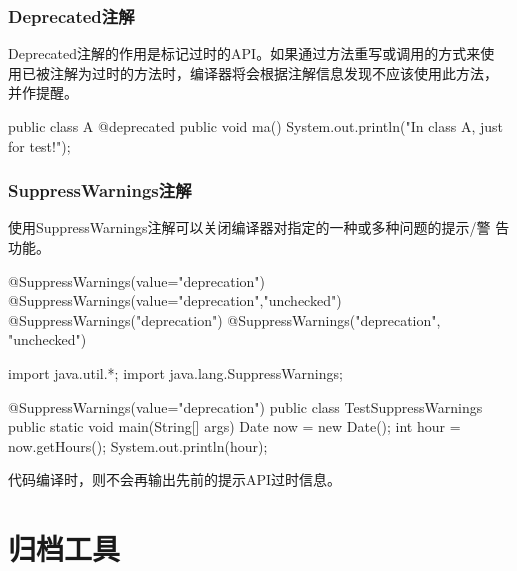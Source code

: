 \begin{frame}[fragile] %
  \frametitle{Deprecated注解}

  Deprecated注解的作用是标记过时的API。如果通过方法重写或调用的方式来使
  用已被注解为过时的方法时，编译器将会根据注解信息发现不应该使用此方法，
  并作提醒。

  \begin{javaCode}
    public class A { 
      @deprecated
      public void ma() {
        System.out.println("In class A, just for test!");
      } 
    }
  \end{javaCode}

\end{frame}

\begin{frame}[fragile] %
  \frametitle{SuppressWarnings注解}

  使用SuppressWarnings注解可以关闭编译器对指定的一种或多种问题的提示/警
  告功能。


  \begin{javaCode}
    @SuppressWarnings(value={"deprecation"})
    @SuppressWarnings(value={"deprecation","unchecked"}) 
    @SuppressWarnings("deprecation") 
    @SuppressWarnings({"deprecation", "unchecked"})
  \end{javaCode}

  \begin{javaCode}
    import java.util.*;
    import java.lang.SuppressWarnings; 

    @SuppressWarnings(value={"deprecation"}) 
    public class TestSuppressWarnings {
      public static void main(String[] args) {
        Date now = new Date();
        int hour = now.getHours(); 
        System.out.println(hour);
      } 
    }  
  \end{javaCode}

  代码编译时，则不会再输出先前的提示API过时信息。
\end{frame}

\section{归档工具}

